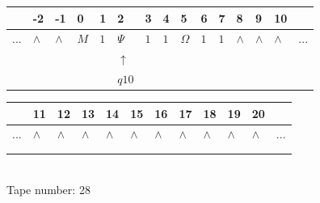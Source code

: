 \documentclass[11pt]{article}
\begin{document}
\begin{table}[H]
\centering
\begin{tabular}{lllllllllllllll}
 & -2 & -1 & 0 & 1 & 2 & 3 & 4 & 5 & 6 & 7 & 8 & 9 & 10 & \\
\hline
$...$ & \multicolumn{1}{|l|}{$\wedge$} & \multicolumn{1}{|l|}{$\wedge$} & \multicolumn{1}{|l|}{$M$} & \multicolumn{1}{|l|}{$1$} & \multicolumn{1}{|l|}{$\Psi$} & \multicolumn{1}{|l|}{$1$} & \multicolumn{1}{|l|}{$1$} & \multicolumn{1}{|l|}{$\Omega$} & \multicolumn{1}{|l|}{$1$} & \multicolumn{1}{|l|}{$1$} & \multicolumn{1}{|l|}{$\wedge$} & \multicolumn{1}{|l|}{$\wedge$} & \multicolumn{1}{|l|}{$\wedge$} & $...$\\
\hline
&  &  &  &  & $\uparrow$ &  &  &  &  &  &  &  &  &  \\
&  &  &  &  & $ q10 $ &  &  &  &  &  &  &  &  &  \\
\end{tabular}
\begin{tabular}{llllllllllll}
 & 11 & 12 & 13 & 14 & 15 & 16 & 17 & 18 & 19 & 20 & \\
\hline
$...$ & \multicolumn{1}{|l|}{$\wedge$} & \multicolumn{1}{|l|}{$\wedge$} & \multicolumn{1}{|l|}{$\wedge$} & \multicolumn{1}{|l|}{$\wedge$} & \multicolumn{1}{|l|}{$\wedge$} & \multicolumn{1}{|l|}{$\wedge$} & \multicolumn{1}{|l|}{$\wedge$} & \multicolumn{1}{|l|}{$\wedge$} & \multicolumn{1}{|l|}{$\wedge$} & \multicolumn{1}{|l|}{$\wedge$} & $...$\\
\hline
&  &  &  &  &  &  &  &  &  &  &  \\
&  &  &  &  &  &  &  &  &  &  &  \\
\end{tabular}
\\
Tape number: 28
\noindent\makebox[\linewidth]{\hdashrule{\textwidth}{1pt}{1pt}}\end{table}
\end{document}
